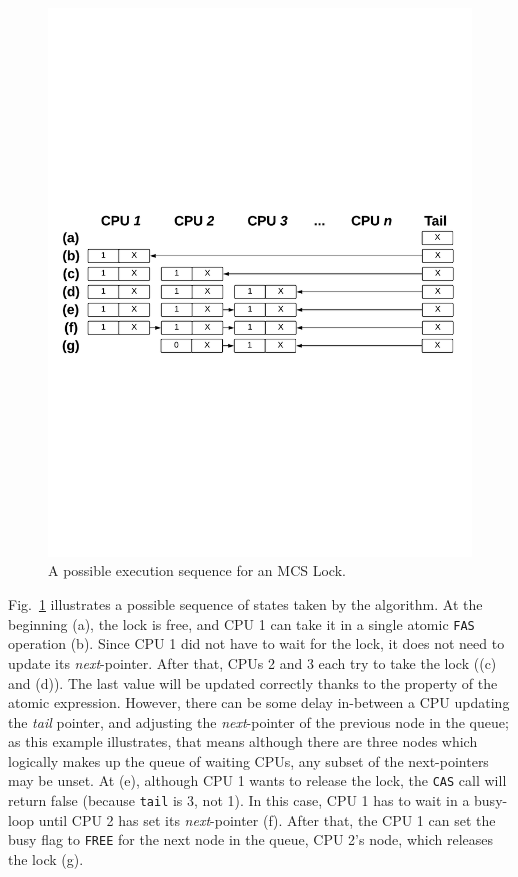 \begin{figure}
\begin{center}
\includegraphics[width=1\linewidth]{figs/mcslock/mcsex}
\end{center}
\caption{A possible execution sequence for an MCS Lock.}
\label{fig:mcs-example}
\end{figure}

Fig.~\ref{fig:mcs-example} illustrates a possible sequence of states taken by the algorithm. 
At the beginning (a), the lock is free, and CPU 1 can take it in a single atomic \texttt{FAS} operation (b).
Since CPU 1 did not have to wait for the lock, it does not need to update its \emph{next}-pointer. 
After that, CPUs 2 and 3 each try to take the lock ((c) and (d)). 
The last value will be updated correctly thanks to the property of the atomic expression.
However, there can be some delay in-between a CPU updating the \emph{tail} pointer, and adjusting the \emph{next}-pointer of the previous node in the queue; as this example illustrates, that means although there are three nodes which logically makes up the queue of waiting CPUs, any subset of the next-pointers may be unset. 
At (e), although CPU 1 wants to release the lock, the \texttt{CAS}
call will return false (because \texttt{tail} is 3, not 1).
In this case, CPU 1 has to wait in a busy-loop until CPU 2 has set its \emph{next}-pointer (f).
After that, the CPU 1 can set the busy flag to \texttt{FREE} for the next node in the queue, CPU 2's node, which releases the lock (g).

